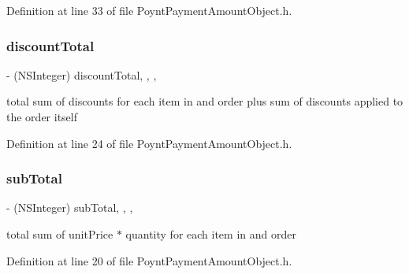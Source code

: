 Definition at line 33 of file Poynt\+Payment\+Amount\+Object.\+h.

\hypertarget{interface_poynt_payment_amount_object_a8a8c1f8f98bf7dc619baeb011a92aa93}{}\label{interface_poynt_payment_amount_object_a8a8c1f8f98bf7dc619baeb011a92aa93} 
\subsubsection{\texorpdfstring{discount\+Total}{discountTotal}}
{\footnotesize\ttfamily -\/ (N\+S\+Integer) discount\+Total\hspace{0.3cm}{\ttfamily [read]}, {\ttfamily [write]}, {\ttfamily [nonatomic]}, {\ttfamily [assign]}}



total sum of discounts for each item in and order plus sum of discounts applied to the order itself 



Definition at line 24 of file Poynt\+Payment\+Amount\+Object.\+h.

\hypertarget{interface_poynt_payment_amount_object_a6d7b64fe4a742c91067809f34bb7d2a2}{}\label{interface_poynt_payment_amount_object_a6d7b64fe4a742c91067809f34bb7d2a2} 
\subsubsection{\texorpdfstring{sub\+Total}{subTotal}}
{\footnotesize\ttfamily -\/ (N\+S\+Integer) sub\+Total\hspace{0.3cm}{\ttfamily [read]}, {\ttfamily [write]}, {\ttfamily [nonatomic]}, {\ttfamily [assign]}}



total sum of unit\+Price $\ast$ quantity for each item in and order 



Definition at line 20 of file Poynt\+Payment\+Amount\+Object.\+h.

\hypertarget{interface_poynt_payment_amount_object_a86fed8c7d04bd309d6af2d0e75942163}{}\label{interface_poynt_payment_amount_object_a86fed8c7d04bd309d6af2d0e75942163} 

